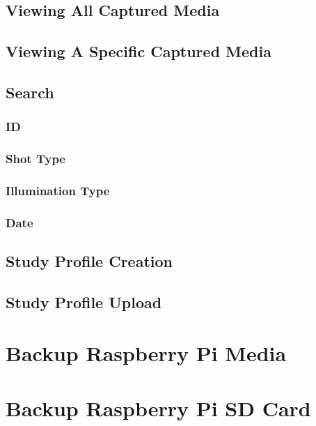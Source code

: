 \documentclass[12pt]{article}
\begin{document}
\subsection{Viewing All Captured Media}
\subsection{Viewing A Specific Captured Media}
\subsection{Search}
\subsubsection{ID}
\subsubsection{Shot Type}
\subsubsection{Illumination Type}
\subsubsection{Date}
\subsection{Study Profile Creation}
\subsection{Study Profile Upload}
\section{Backup Raspberry Pi Media}
\section{Backup Raspberry Pi SD Card}
\end{document}
